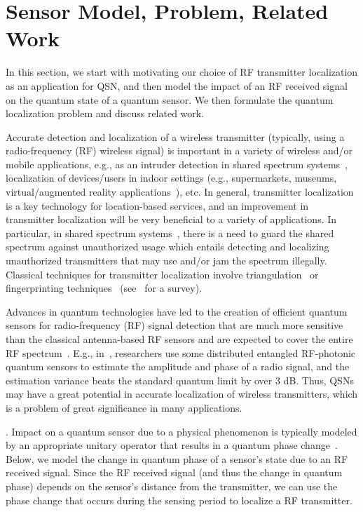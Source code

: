 \section{Sensor Model, Problem, Related Work}
\label{sec:quantum_problem}

In this section, we start with motivating our choice of RF transmitter localization as an application for QSN, and then model the impact of an RF received signal on the quantum state of a quantum sensor. We then formulate the quantum localization problem and discuss related work.

Accurate detection and localization of a wireless transmitter 
(typically, using a radio-frequency (RF) wireless signal) is important in a 
variety of wireless and/or mobile
applications, e.g.,
as an intruder detection in shared spectrum systems~\cite{arani2018}, localization of devices/users in
indoor settings (e.g., supermarkets, museums, virtual/augmented reality applications~\cite{sigcomm22-cyclops}), 
etc. In general,
transmitter localization is a key technology for location-based services, and an 
improvement in transmitter localization will be very
beneficial to a variety of applications.
In particular, 
in shared spectrum systems~\cite{arani2018}, there is a need to guard the shared spectrum
against unauthorized usage which entails detecting and localizing unauthorized transmitters that may
use and/or jam the spectrum illegally.
Classical techniques for transmitter localization involve triangulation~\cite{nsdi13-arraytrack} or fingerprinting techniques~\cite{infocom00-radar} (see~\cite{localization-survey} for a survey).

Advances in quantum technologies have led to the creation of efficient quantum sensors for
radio-frequency (RF) signal detection that are much more sensitive than the classical 
antenna-based RF sensors and are expected to cover the entire 
RF spectrum~\cite{PhysRevApplied.rydberg}. 
E.g., in~\cite{PRL20-qsn},
researchers use some distributed entangled RF-photonic quantum
sensors to estimate the amplitude and phase of a radio
signal, and the estimation variance beats the standard quantum
limit by over 3 dB. 
Thus, QSNs may have a great potential in accurate localization of wireless 
transmitters, which is a problem of great significance in many applications.

. 
Impact on a quantum sensor due to a physical phenomenon is typically modeled by an appropriate unitary operator that results in a quantum phase change~\cite{RevModPhys.quantumsensing}. Below, we model the change in quantum phase
of a sensor's state due to an RF received signal. 
Since the RF received signal (and thus the change in quantum phase) depends on the sensor's distance 
from the transmitter, we can use the phase change that occurs 
during the sensing period to localize a RF transmitter.

